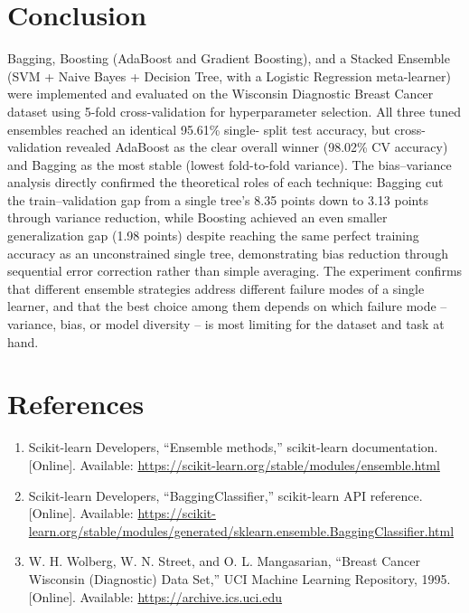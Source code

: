 \documentclass[12pt,a4paper]{article}
\DeclareRobustCommand{\_}{\textunderscore\allowbreak}
\begin{document}
\section{Conclusion}
Bagging, Boosting (AdaBoost and Gradient Boosting), and a Stacked Ensemble
(SVM + Naive Bayes + Decision Tree, with a Logistic Regression
meta-learner) were implemented and evaluated on the Wisconsin Diagnostic
Breast Cancer dataset using 5-fold cross-validation for hyperparameter
selection. All three tuned ensembles reached an identical 95.61\% single-
split test accuracy, but cross-validation revealed AdaBoost as the clear
overall winner (98.02\% CV accuracy) and Bagging as the most stable
(lowest fold-to-fold variance). The bias--variance analysis directly
confirmed the theoretical roles of each technique: Bagging cut the
train--validation gap from a single tree's 8.35 points down to 3.13 points
through variance reduction, while Boosting achieved an even smaller
generalization gap (1.98 points) despite reaching the same perfect
training accuracy as an unconstrained single tree, demonstrating bias
reduction through sequential error correction rather than simple averaging.
The experiment confirms that different ensemble strategies address
different failure modes of a single learner, and that the best choice
among them depends on which failure mode -- variance, bias, or model
diversity -- is most limiting for the dataset and task at hand.

\section{References}
\begin{enumerate}
\item Scikit-learn Developers, ``Ensemble methods,'' scikit-learn
documentation. [Online]. Available:
\url{https://scikit-learn.org/stable/modules/ensemble.html}
\item Scikit-learn Developers, ``BaggingClassifier,'' scikit-learn API
reference. [Online]. Available:
\url{https://scikit-learn.org/stable/modules/generated/sklearn.ensemble.BaggingClassifier.html}
\item W. H. Wolberg, W. N. Street, and O. L. Mangasarian, ``Breast Cancer
Wisconsin (Diagnostic) Data Set,'' UCI Machine Learning Repository, 1995.
[Online]. Available: \url{https://archive.ics.uci.edu}
\end{enumerate}
\end{document}
